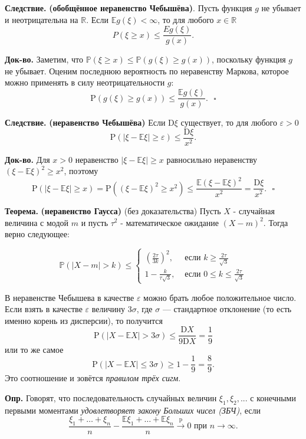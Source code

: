 \documentclass[oneside,final,14pt]{extreport}
\newcommand\mydef{{\bf Опр.}}
\newcommand\mycon{{\bf Следствие.}}
\newcommand\myth{{\bf Теорема.}}
\newcommand\myqed{{\bf Док-во.}}
\newcommand\myprob[1]{{\mathbb{P}(#1)}}
\theoremstyle{definition}
\begin{document}
\mycon{} \textbf{(обобщённое неравенство Чебышёва)}. Пусть функция $g$ не убывает и неотрицательна на $\mathbb{R}.$ Если $\mathbb{E}g(\xi) < \infty$, то для любого $x \in \mathbb{R}$
$$P(\xi \geqslant x) \leqslant \frac{E g(\xi)}{g(x)}.$$

\myqed{} Заметим, что $\myprob{\xi \geqslant x} \leqslant \myprob{g(\xi) \geqslant g(x)}$, поскольку функция $g$ не убывает. Оценим последнюю вероятность по неравенству Маркова, которое можно применять в силу неотрицательности $g$:
$$\mathrm{P}(g(\xi) \geqslant g(x)) \leqslant \frac{\mathbb{E} g(\xi)}{g(x)}. ~~~ \square$$

\mycon{} \textbf{(неравенство Чебышёва)} Если $\mathrm{D}\xi$ существует, то для любого $\varepsilon > 0$
$$\mathrm{P}(|\xi-\mathbb{E} \xi| \geqslant \varepsilon) \leqslant \frac{\mathrm{D} \xi}{x^{2}}.$$

\myqed{} Для $x > 0$ неравенство $|\xi - \mathbb{E}\xi| \geqslant x$ равносильно неравенству $(\xi - \mathbb{E}\xi)^2 \geqslant x^2$, поэтому
$$\mathrm{P}(|\xi-\mathbb{E} \xi| \geqslant x)=\mathrm{P}\left((\xi-\mathbb{E} \xi)^{2} \geqslant x^{2}\right) \leqslant \frac{\mathbb{E}(\xi-\mathbb{E} \xi)^{2}}{x^{2}}=\frac{\mathrm{D} \xi}{x^{2}}. ~~~\square$$

\myth{} \textbf{(неравенство Гаусса)} (без доказательства) Пусть $X$ - случайная величина с модой $m$ и пусть $\tau^2$ - математическое ожидание $(X - m)^2.$ Тогда верно следующее:

$$\mathbb{P}(|X-m|>k) \leq\left\{\begin{array}{ll}
\left(\frac{2 \tau}{3 k}\right)^{2}, & \text { если } k \geq \frac{2 \tau}{\sqrt{3}} \\
1-\frac{k}{\tau \sqrt{3}}, & \text { если } 0 \leqslant k \leqslant \frac{2 \tau}{\sqrt{3}}
\end{array}\right.$$

В неравенстве Чебышева в качестве $\varepsilon$ можно брать любое положительное число. Если взять в качестве $\varepsilon$ величину $3\sigma$, где $\sigma$ — стандартное отклонение (то есть именно корень из дисперсии), то получится
$$\mathrm{P}(|X-\mathbb{E} X|>3 \sigma) \leqslant \frac{\mathrm{D} X}{9 \mathrm{D} X}=\frac{1}{9}$$
или то же самое $$\mathrm{P}(|X-\mathbb{E} X| \leqslant 3 \sigma) \geqslant 1-\frac{1}{9}=\frac{8}{9}.$$ 
Это соотношение и зовётся {\it правилом трёх сигм}.

\mydef{} Говорят, что последовательность случайных величин $\xi_1, \xi_2, ...$ с конечными первыми моментами {\it удовлетворяет закону Больших чисел (ЗБЧ)}, если
$$\frac{\xi_{1}+\ldots+\xi_{n}}{n}-\frac{\mathbb{E} \xi_{1}+\ldots+\mathbb{E} \xi_{n}}{n} \stackrel{\mathrm{p}}{\longrightarrow} 0 \text { при } n \rightarrow \infty.$$
\end{document}
